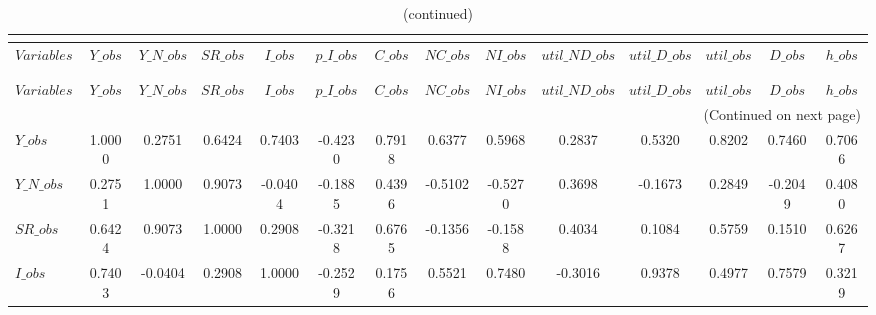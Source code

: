  
\begin{center}
\begin{longtable}{lccccccccccccc} 
\caption{MATRIX OF CORRELATIONS}\\
 \label{Table:th_corr_matrix}\\
\toprule 
$Variables      $	 & 	 $          Y\_obs$	 & 	 $      Y\_N\_obs$	 & 	 $         SR\_obs$	 & 	 $          I\_obs$	 & 	 $      p\_I\_obs$	 & 	 $          C\_obs$	 & 	 $         NC\_obs$	 & 	 $         NI\_obs$	 & 	 $  util\_ND\_obs$	 & 	 $   util\_D\_obs$	 & 	 $       util\_obs$	 & 	 $          D\_obs$	 & 	 $          h\_obs$\\
\midrule \endfirsthead 
\caption{(continued)}\\
 \toprule \\ 
$Variables      $	 & 	 $          Y\_obs$	 & 	 $      Y\_N\_obs$	 & 	 $         SR\_obs$	 & 	 $          I\_obs$	 & 	 $      p\_I\_obs$	 & 	 $          C\_obs$	 & 	 $         NC\_obs$	 & 	 $         NI\_obs$	 & 	 $  util\_ND\_obs$	 & 	 $   util\_D\_obs$	 & 	 $       util\_obs$	 & 	 $          D\_obs$	 & 	 $          h\_obs$\\
\midrule \endhead 
\midrule \multicolumn{14}{r}{(Continued on next page)} \\ \bottomrule \endfoot 
\bottomrule \endlastfoot 
$Y\_obs         $	 & 	           1.0000	 & 	           0.2751	 & 	           0.6424	 & 	           0.7403	 & 	          -0.4230	 & 	           0.7918	 & 	           0.6377	 & 	           0.5968	 & 	           0.2837	 & 	           0.5320	 & 	           0.8202	 & 	           0.7460	 & 	           0.7066 \\ 
$Y\_N\_obs      $	 & 	           0.2751	 & 	           1.0000	 & 	           0.9073	 & 	          -0.0404	 & 	          -0.1885	 & 	           0.4396	 & 	          -0.5102	 & 	          -0.5270	 & 	           0.3698	 & 	          -0.1673	 & 	           0.2849	 & 	          -0.2049	 & 	           0.4080 \\ 
$SR\_obs        $	 & 	           0.6424	 & 	           0.9073	 & 	           1.0000	 & 	           0.2908	 & 	          -0.3218	 & 	           0.6765	 & 	          -0.1356	 & 	          -0.1588	 & 	           0.4034	 & 	           0.1084	 & 	           0.5759	 & 	           0.1510	 & 	           0.6267 \\ 
$I\_obs         $	 & 	           0.7403	 & 	          -0.0404	 & 	           0.2908	 & 	           1.0000	 & 	          -0.2529	 & 	           0.1756	 & 	           0.5521	 & 	           0.7480	 & 	          -0.3016	 & 	           0.9378	 & 	           0.4977	 & 	           0.7579	 & 	           0.3219 \\ 

\end{longtable}
\end{center}

